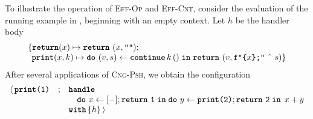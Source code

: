 To illustrate the operation of \textsc{Eff-Op} and \textsc{Eff-Cnt}, consider the evaluation of the running example in , beginning with an empty context. Let $h$ be the handler body 
\[\begin{array}{l}\{ \textbf{\texttt{return}}(x) \mapsto {\texttt{\textbf{return}} \,\, {(x, \texttt{""})}}; \\
\; \, \textbf{\texttt{print}}(x, k) \mapsto {\texttt{\textbf{do}} \,\, {(v, s)} \leftarrow {\textbf{\texttt{continue}} \, {k} \, {()}} \; \textbf{\texttt{in}} \; {\texttt{\textbf{return}} \,\, {(v, \texttt{f"\{$x$\};"} \text{ \^\ } s)}}}\}\end{array}\]
After several applications of \textsc{Cng-Psh}, we obtain the configuration
{  \arraycolsep=3pt
\small
\[\begin{array}{rcl}
  \langle \, \texttt{\textbf{print}(1)} &;& \textbf{\texttt{handle}}\\
                        && \quad \texttt{\textbf{do}} \,\, {x} \leftarrow {[-];\texttt{\textbf{return}} \,\, {\texttt{1}}} \; \textbf{\texttt{in}} \; {{\texttt{\textbf{do}} \,\, {y} \leftarrow {\texttt{\textbf{print}(2)};\texttt{\textbf{return}} \,\, {\texttt{2}}} \; \textbf{\texttt{in}} \; {\, x + y}}} \\
                        && \textbf{\texttt{with}} \, \{ h \}\, \rangle
\end{array}
  \]
}

